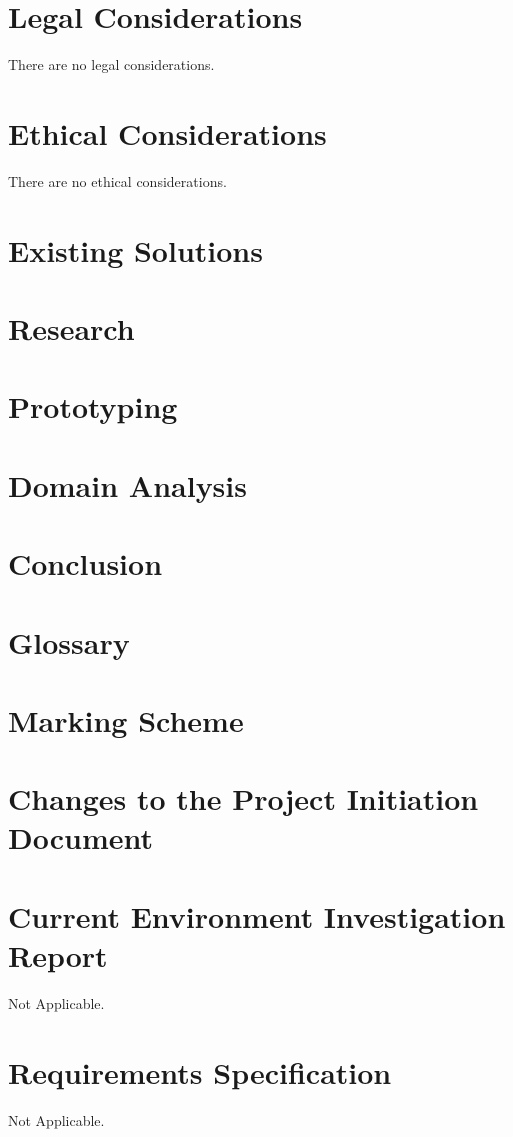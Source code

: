 \documentclass[a4paper,12pt]{report}
\begin{document}
\chapter{Legal Considerations}
There are no legal considerations.
\chapter{Ethical Considerations}
There are no ethical considerations.
\chapter{Existing Solutions}

\chapter{Research}

\chapter{Prototyping}

\chapter{Domain Analysis}

\chapter{Conclusion}


\printbibliography[heading=bibintoc]

\appendix
\chapter{Glossary}
\printglossaries
\chapter{Marking Scheme}
\chapter{Changes to the Project Initiation Document}
\chapter{Current Environment Investigation Report}
Not Applicable.
\chapter{Requirements Specification}
Not Applicable.
\end{document}
